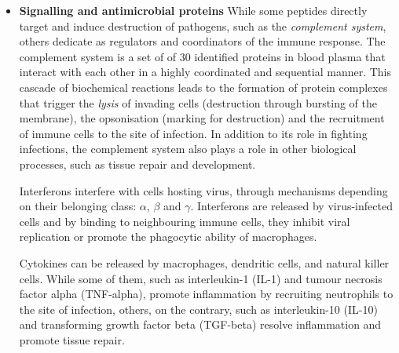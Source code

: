 \begin{itemize}
    \emph{Natural killer cells} can induce the death of virus-infected cells \footnote{The term \enquote{natural} stems from their direct action, without prior exposure or activation, while the neutralisation mechanism is akin to the TCD8 cell type. Additionally, they are strongly related to lymphocytes involved in adaptive immune response (\ref{subsec:adaptive-system}, making part of a third component}. NK cells proceed by first detecting abnormal surface-receptors proteins, such as stress signals or tumour antigens, and then by releasing toxic molecules that trigger \emph{apoptosis}, a programmed death of the stricken cell. 
    
    More specialised cells involve \emph{dentritic cells}, whose main function is to coordinate the innate and the adaptive response \ref{subsec:collab-innate-adaptive}, \emph{mast cells} contribute to the inflammatory response but are also involved in aberrant reactions such as allergies, along with \emph{eosinophils} and \emph{basophils}, whose original function was the protection against multicellular parasites, such as worms, that usually require an even stronger reaction. 
    
    \item \textbf{Signalling and antimicrobial proteins} While some peptides directly target and induce destruction of pathogens, such as the \emph{complement system}, others dedicate as regulators and coordinators of the immune response. The complement system is a set of of 30 identified proteins in blood plasma that interact with each other in a highly coordinated and sequential manner. This cascade of biochemical reactions leads to the formation of protein complexes that trigger the \emph{lysis} of invading cells (destruction through bursting of the membrane), the opsonisation (marking for destruction) and the recruitment of immune cells to the site of infection. In addition to its role in fighting infections, the complement system also plays a role in other biological processes, such as tissue repair and development.
    
    Interferons interfere with  cells hosting virus, through mechanisms depending on their belonging class: $\alpha$, $\beta$ and $\gamma$. Interferons are released by virus-infected cells and by binding to neighbouring immune cells, they inhibit viral replication or promote the phagocytic ability of macrophages.

    Cytokines can be released by macrophages, dendritic cells, and natural killer cells. While some of them, such as interleukin-1 (IL-1) and tumour necrosis factor alpha (TNF-alpha), promote inflammation by recruiting neutrophils to the site of infection, others, on the contrary, such as interleukin-10 (IL-10) and transforming growth factor beta (TGF-beta) resolve inflammation and promote tissue repair.  
    

\end{itemize}
